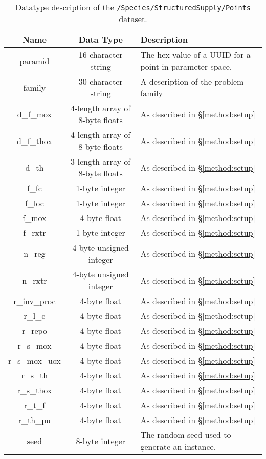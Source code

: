 \begin{table}[h!]
\centering
\caption{\label{tbl:/Species/StructuredSupply/Points}
Datatype description of the \lstinline[basicstyle=\ttfamily\color{black}]|/Species/StructuredSupply/Points| dataset.}
\begin{tabularx}{\columnwidth-10pt}{|c|c|X|} %
\hline
\textbf{Name} & \textbf{Data Type} & \textbf{Description}       \\ \hline
paramid & 16-character string & The hex value of a UUID for a point in parameter space. \\ \hline
family & 30-character string & A description of the problem family \\ \hline
d\_f\_mox & 4-length array of 8-byte floats & As described in \S \ref{method:setup} \\ \hline
d\_f\_thox & 4-length array of 8-byte floats & As described in \S \ref{method:setup} \\ \hline
d\_th & 3-length array of 8-byte floats & As described in \S \ref{method:setup} \\ \hline
f\_fc & 1-byte integer & As described in \S \ref{method:setup} \\ \hline
f\_loc & 1-byte integer & As described in \S \ref{method:setup} \\ \hline
f\_mox & 4-byte float & As described in \S \ref{method:setup} \\ \hline
f\_rxtr & 1-byte integer & As described in \S \ref{method:setup} \\ \hline
n\_reg & 4-byte unsigned integer & As described in \S \ref{method:setup} \\ \hline
n\_rxtr & 4-byte unsigned integer & As described in \S \ref{method:setup} \\ \hline
r\_inv\_proc & 4-byte float & As described in \S \ref{method:setup} \\ \hline
r\_l\_c & 4-byte float & As described in \S \ref{method:setup} \\ \hline
r\_repo & 4-byte float & As described in \S \ref{method:setup} \\ \hline
r\_s\_mox & 4-byte float & As described in \S \ref{method:setup} \\ \hline
r\_s\_mox\_uox & 4-byte float & As described in \S \ref{method:setup} \\ \hline
r\_s\_th & 4-byte float & As described in \S \ref{method:setup} \\ \hline
r\_s\_thox & 4-byte float & As described in \S \ref{method:setup} \\ \hline
r\_t\_f & 4-byte float & As described in \S \ref{method:setup} \\ \hline
r\_th\_pu & 4-byte float & As described in \S \ref{method:setup} \\ \hline
seed & 8-byte integer & The random seed used to generate an instance. \\ \hline
\end{tabularx}
\end{table}


